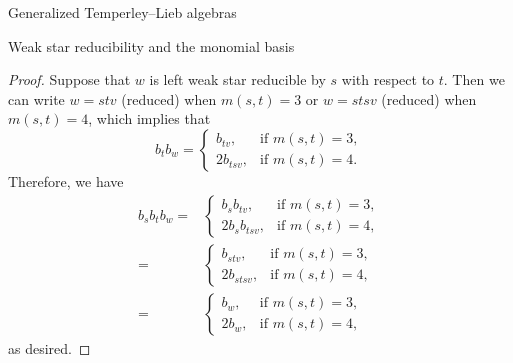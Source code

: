 \documentclass[11pt]{amsart}
\theoremstyle{definition}
\numberwithin{equation}{section}
\renewcommand{\(}{\left(}
\renewcommand{\)}{\right)}
\begin{document}
\begin{section}{Generalized Temperley--Lieb algebras}
\begin{subsection}{Weak star reducibility and the monomial basis}
\begin{proof}
Suppose that $w$ is left weak star reducible by $s$ with respect to $t$.  Then we can write $w=stv$ (reduced) when $m(s,t)=3$ or $w=stsv$ (reduced) when $m(s,t)=4$, which implies that
\[
b_{t}b_{w}=\begin{cases}
b_{tv},   & \text{if } m(s,t)=3, \\
2b_{tsv},   & \text{if } m(s,t)=4.
\end{cases}
\]
Therefore, we have
{\allowdisplaybreaks
\begin{align*}
b_{s}b_{t}b_{w}=&\begin{cases}
b_{s}b_{tv},   & \text{if } m(s,t)=3, \\
2b_{s}b_{tsv},   & \text{if } m(s,t)=4,
\end{cases}\\
=& \begin{cases}
b_{stv},   & \text{if } m(s,t)=3, \\
2b_{stsv},   & \text{if } m(s,t)=4,
\end{cases}\\
=& \begin{cases}
b_{w},   & \text{if } m(s,t)=3, \\
2b_{w},   & \text{if } m(s,t)=4,
\end{cases}
\end{align*}}%
as desired.
\end{proof}

\end{subsection}

\end{section}
\end{document}
